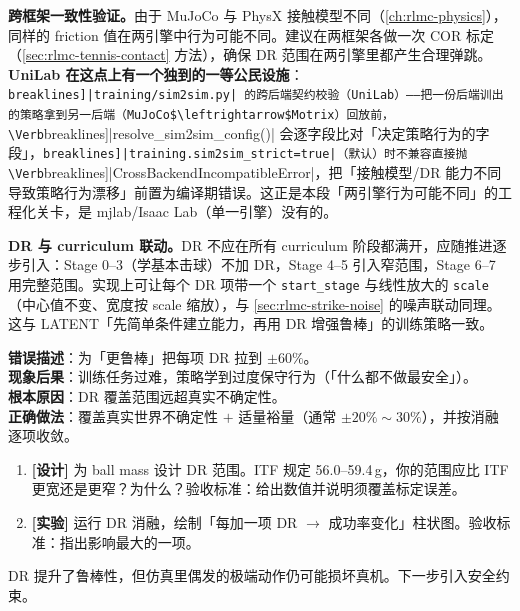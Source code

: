\textbf{跨框架一致性验证。}由于 MuJoCo 与 PhysX 接触模型不同（\cref{ch:rlmc-physics}），同样的 friction 值在两引擎中行为可能不同。建议在两框架各做一次 COR 标定（\cref{sec:rlmc-tennis-contact} 方法），确保 DR 范围在两引擎里都产生合理弹跳。\textbf{UniLab 在这点上有一个独到的一等公民设施}：\Verb[breaklines]|training/sim2sim.py| 的跨后端契约校验（UniLab）——把一份后端训出的策略拿到另一后端（MuJoCo$\leftrightarrow$Motrix）回放前，\Verb[breaklines]|resolve_sim2sim_config()| 会逐字段比对「决定策略行为的字段」，\Verb[breaklines]|training.sim2sim_strict=true|（默认）时不兼容直接抛 \Verb[breaklines]|CrossBackendIncompatibleError|，把「接触模型/DR 能力不同导致策略行为漂移」前置为编译期错误。这正是本段「两引擎行为可能不同」的工程化关卡，是 mjlab/Isaac Lab（单一引擎）没有的。

\textbf{DR 与 curriculum 联动。}DR 不应在所有 curriculum 阶段都满开，应随推进逐步引入：Stage 0--3（学基本击球）不加 DR，Stage 4--5 引入窄范围，Stage 6--7 用完整范围。实现上可让每个 DR 项带一个 \verb|start_stage| 与线性放大的 \verb|scale|（中心值不变、宽度按 scale 缩放），与 \cref{sec:rlmc-strike-noise} 的噪声联动同理。这与 LATENT「先简单条件建立能力，再用 DR 增强鲁棒」的训练策略一致。

\begin{pitfall}[DR 范围越宽越好]
\textbf{错误描述}：为「更鲁棒」把每项 DR 拉到 $\pm 60\%$。\\
\textbf{现象后果}：训练任务过难，策略学到过度保守行为（「什么都不做最安全」）。\\
\textbf{根本原因}：DR 覆盖范围远超真实不确定性。\\
\textbf{正确做法}：覆盖真实世界不确定性 $+$ 适量裕量（通常 $\pm 20\%\sim30\%$），并按消融逐项收敛。
\end{pitfall}

\begin{practice}[本节动手任务]
\begin{enumerate}
  \item \textbf{[设计]} 为 ball mass 设计 DR 范围。ITF 规定 56.0--59.4\,g，你的范围应比 ITF 更宽还是更窄？为什么？验收标准：给出数值并说明须覆盖标定误差。
  \item \textbf{[实验]} 运行 DR 消融，绘制「每加一项 DR $\to$ 成功率变化」柱状图。验收标准：指出影响最大的一项。
\end{enumerate}
\end{practice}

\noindent{}DR 提升了鲁棒性，但仿真里偶发的极端动作仍可能损坏真机。下一步引入安全约束。


